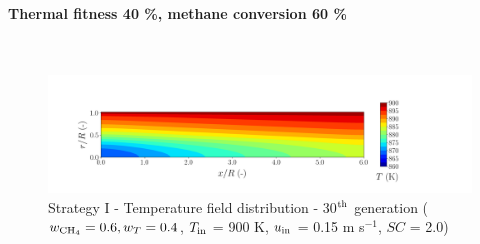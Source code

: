 \documentclass[preprint,12pt]{elsarticle}
\begin{document}


\clearpage



\paragraph{Thermal fitness 40 \%, methane conversion 60 \%} \hspace{0pt} \\
\noindent 

%

\begin{figure}[h!]
\centering
\includegraphics[width=190mm]{results/5/60C_40T/GEN30-TFIELD.png}
\caption{\label{fig:5R6040G30-TField} Strategy I - Temperature field distribution - 30$^{\rm{th}}$ generation ($w_{\rm{CH_4}} = 0.6, w_T = 0.4$, $T_{\rm{in}}$ = 900 K, $u_{\rm{in}}$ = 0.15 m s$^{-1}$, $SC$ = 2.0)}
\end{figure}

%
\end{document}
